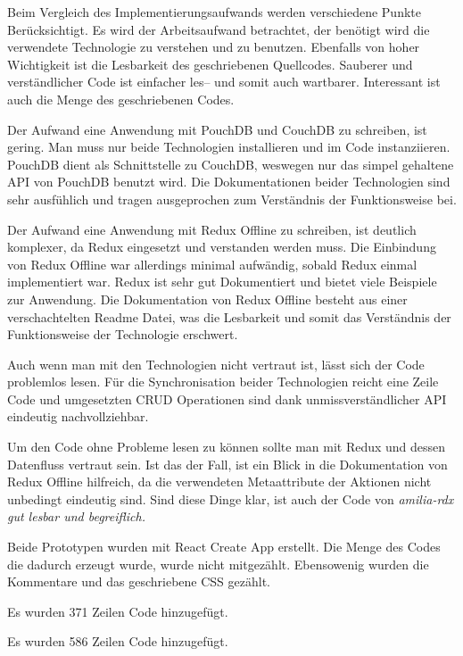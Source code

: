 Beim Vergleich des Implementierungsaufwands werden verschiedene Punkte Berücksichtigt.
Es wird der Arbeitsaufwand betrachtet, der benötigt wird die verwendete Technologie zu verstehen und zu benutzen.
Ebenfalls von hoher Wichtigkeit ist die Lesbarkeit des geschriebenen Quellcodes.
Sauberer und verständlicher Code ist einfacher les-- und somit auch wartbarer. Interessant ist auch die Menge des geschriebenen Codes.
%
\begin{description}[leftmargin=0cm,style=nextline]
  \item[amilia-qouch]
  Der Aufwand eine Anwendung mit PouchDB und CouchDB zu schreiben, ist gering.
  Man muss nur beide Technologien installieren und im Code instanziieren.
  PouchDB dient als Schnittstelle zu CouchDB, weswegen nur das simpel gehaltene \gls{API} von PouchDB benutzt wird.
  Die Dokumentationen beider Technologien sind sehr ausfühlich und tragen ausgeprochen zum Verständnis der Funktionsweise bei.

  \item[amilia-rdx]
  Der Aufwand eine Anwendung mit Redux Offline zu schreiben, ist deutlich komplexer, da Redux eingesetzt und verstanden werden muss.
  Die Einbindung von Redux Offline war allerdings minimal aufwändig, sobald Redux einmal implementiert war.
  Redux ist sehr gut Dokumentiert und bietet viele Beispiele zur Anwendung.
  Die Dokumentation von Redux Offline besteht aus einer verschachtelten Readme Datei, was die Lesbarkeit und somit das Verständnis der Funktionsweise der Technologie erschwert.
\end{description}
%
\begin{description}[leftmargin=0cm,style=nextline]
  \item[amilia-qouch]
  Auch wenn man mit den Technologien nicht vertraut ist, lässt sich der Code problemlos lesen.
  Für die Synchronisation beider Technologien reicht eine Zeile Code und umgesetzten \gls{CRUD} Operationen sind dank unmissverständlicher API eindeutig nachvollziehbar.
  \item[amilia-rdx] 
  Um den Code ohne Probleme lesen zu können sollte man mit Redux und dessen Datenfluss vertraut sein.
  Ist das der Fall, ist ein Blick in die Dokumentation von Redux Offline hilfreich, da die verwendeten Metaattribute der Aktionen nicht unbedingt eindeutig sind.
  Sind diese Dinge klar, ist auch der Code von \it{amilia-rdx} gut lesbar und begreiflich.
\end{description}
%
  Beide Prototypen wurden mit React Create App erstellt.
  Die Menge des Codes die dadurch erzeugt wurde, wurde nicht mitgezählt. Ebensowenig wurden die Kommentare und das geschriebene \gls{CSS} gezählt.
\begin{description}[leftmargin=0cm,style=nextline]
    \item[amilia-qouch]
    Es wurden 371 Zeilen Code hinzugefügt.
    \item[amilia-rdx] 
    Es wurden 586 Zeilen Code hinzugefügt.
\end{description}